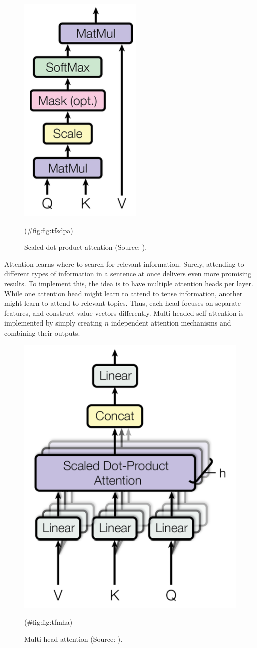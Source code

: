 \documentclass[
]{krantz}
\begin{document}
\begin{figure}

{\centering \includegraphics[width=0.18\linewidth]{./figures/01-01-nlp/transformers_scaled-dot-attention2_vaswani} 

}

\caption{Scaled dot-product attention (Source: \citet{vaswani2017attention}).}(\#fig:fig:tfsdpa)
\end{figure}



Attention learns where to search for relevant information. Surely,
attending to different types of information in a sentence at once
delivers even more promising results. To implement this, the idea is to
have multiple attention heads per layer. While one attention head might
learn to attend to tense information, another might learn to attend to
relevant topics. Thus, each head focuses on separate features, and
construct value vectors differently. Multi-headed self-attention is
implemented by simply creating \(n\) independent attention mechanisms and
combining their outputs.

\begin{figure}

{\centering \includegraphics[width=0.34\linewidth]{./figures/01-01-nlp/transformers_multi-head-attention2_vaswani} 

}

\caption{Multi-head attention (Source: \citet{vaswani2017attention}).}(\#fig:fig:tfmha)
\end{figure}
\end{document}
